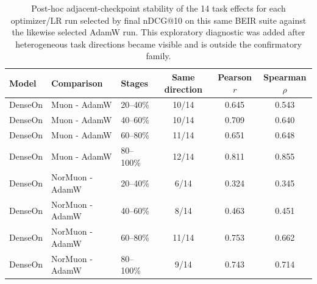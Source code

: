 \begin{table}[t]
\centering
\small
\begin{tabular}{lllccc}
\toprule
Model & Comparison & Stages & Same direction & Pearson $r$ & Spearman $\rho$ \\
\midrule
DenseOn & Muon - AdamW & 20--40\% & 10/14 & 0.645 & 0.543 \\
DenseOn & Muon - AdamW & 40--60\% & 10/14 & 0.709 & 0.640 \\
DenseOn & Muon - AdamW & 60--80\% & 11/14 & 0.651 & 0.648 \\
DenseOn & Muon - AdamW & 80--100\% & 12/14 & 0.811 & 0.855 \\
DenseOn & NorMuon - AdamW & 20--40\% & 6/14 & 0.324 & 0.345 \\
DenseOn & NorMuon - AdamW & 40--60\% & 8/14 & 0.463 & 0.451 \\
DenseOn & NorMuon - AdamW & 60--80\% & 11/14 & 0.753 & 0.662 \\
DenseOn & NorMuon - AdamW & 80--100\% & 9/14 & 0.743 & 0.714 \\
\bottomrule
\end{tabular}
\caption{Post-hoc adjacent-checkpoint stability of the 14 task effects for each optimizer/LR run selected by final nDCG@10 on this same BEIR suite against the likewise selected AdamW run. This exploratory diagnostic was added after heterogeneous task directions became visible and is outside the confirmatory family.}
\label{tab:task-delta-stability}
\end{table}
